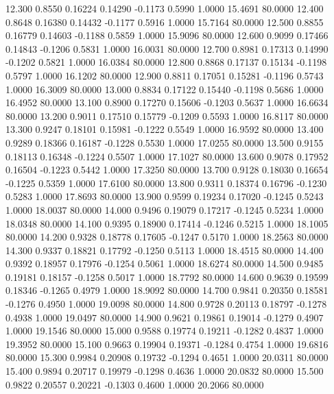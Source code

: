  12.300   0.8550   0.16224   0.14290  -0.1173   0.5990   1.0000  15.4691  80.0000
  12.400   0.8648   0.16380   0.14432  -0.1177   0.5916   1.0000  15.7164  80.0000
  12.500   0.8855   0.16779   0.14603  -0.1188   0.5859   1.0000  15.9096  80.0000
  12.600   0.9099   0.17466   0.14843  -0.1206   0.5831   1.0000  16.0031  80.0000
  12.700   0.8981   0.17313   0.14990  -0.1202   0.5821   1.0000  16.0384  80.0000
  12.800   0.8868   0.17137   0.15134  -0.1198   0.5797   1.0000  16.1202  80.0000
  12.900   0.8811   0.17051   0.15281  -0.1196   0.5743   1.0000  16.3009  80.0000
  13.000   0.8834   0.17122   0.15440  -0.1198   0.5686   1.0000  16.4952  80.0000
  13.100   0.8900   0.17270   0.15606  -0.1203   0.5637   1.0000  16.6634  80.0000
  13.200   0.9011   0.17510   0.15779  -0.1209   0.5593   1.0000  16.8117  80.0000
  13.300   0.9247   0.18101   0.15981  -0.1222   0.5549   1.0000  16.9592  80.0000
  13.400   0.9289   0.18366   0.16187  -0.1228   0.5530   1.0000  17.0255  80.0000
  13.500   0.9155   0.18113   0.16348  -0.1224   0.5507   1.0000  17.1027  80.0000
  13.600   0.9078   0.17952   0.16504  -0.1223   0.5442   1.0000  17.3250  80.0000
  13.700   0.9128   0.18030   0.16654  -0.1225   0.5359   1.0000  17.6100  80.0000
  13.800   0.9311   0.18374   0.16796  -0.1230   0.5283   1.0000  17.8693  80.0000
  13.900   0.9599   0.19234   0.17020  -0.1245   0.5243   1.0000  18.0037  80.0000
  14.000   0.9496   0.19079   0.17217  -0.1245   0.5234   1.0000  18.0348  80.0000
  14.100   0.9395   0.18900   0.17414  -0.1246   0.5215   1.0000  18.1005  80.0000
  14.200   0.9328   0.18778   0.17605  -0.1247   0.5170   1.0000  18.2563  80.0000
  14.300   0.9337   0.18821   0.17792  -0.1250   0.5113   1.0000  18.4515  80.0000
  14.400   0.9392   0.18957   0.17976  -0.1254   0.5061   1.0000  18.6274  80.0000
  14.500   0.9485   0.19181   0.18157  -0.1258   0.5017   1.0000  18.7792  80.0000
  14.600   0.9639   0.19599   0.18346  -0.1265   0.4979   1.0000  18.9092  80.0000
  14.700   0.9841   0.20350   0.18581  -0.1276   0.4950   1.0000  19.0098  80.0000
  14.800   0.9728   0.20113   0.18797  -0.1278   0.4938   1.0000  19.0497  80.0000
  14.900   0.9621   0.19861   0.19014  -0.1279   0.4907   1.0000  19.1546  80.0000
  15.000   0.9588   0.19774   0.19211  -0.1282   0.4837   1.0000  19.3952  80.0000
  15.100   0.9663   0.19904   0.19371  -0.1284   0.4754   1.0000  19.6816  80.0000
  15.300   0.9984   0.20908   0.19732  -0.1294   0.4651   1.0000  20.0311  80.0000
  15.400   0.9894   0.20717   0.19979  -0.1298   0.4636   1.0000  20.0832  80.0000
  15.500   0.9822   0.20557   0.20221  -0.1303   0.4600   1.0000  20.2066  80.0000
